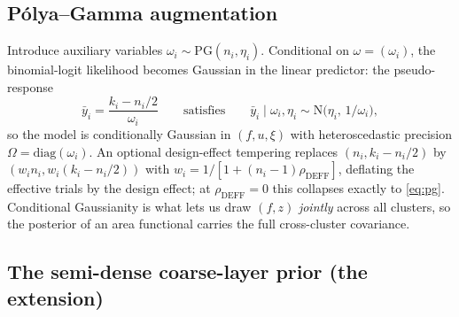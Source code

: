 \documentclass[11pt]{article}
\theoremstyle{remark}
\newcommand{\N}{\mathrm{N}}
\newcommand{\PG}{\mathrm{PG}}
\begin{document}
\subsection{P\'olya--Gamma augmentation}\label{sec:pg}

Introduce auxiliary variables $\omega_i \sim \PG(n_i,\eta_i)$. Conditional on
$\omega=(\omega_i)$, the binomial-logit likelihood becomes Gaussian in the linear
predictor: the pseudo-response
\begin{equation}\label{eq:pg}
\bar y_i = \frac{k_i - n_i/2}{\omega_i}
\qquad\text{satisfies}\qquad
\bar y_i \mid \omega_i,\eta_i \sim \N\!\bigl(\eta_i,\, 1/\omega_i\bigr),
\end{equation}
so the model is conditionally Gaussian in $(f,u,\xi)$ with heteroscedastic
precision $\Omega=\mathrm{diag}(\omega_i)$. An optional design-effect tempering
replaces $(n_i, k_i-n_i/2)$ by $(w_i n_i, w_i(k_i-n_i/2))$ with $w_i =
1/[1+(n_i-1)\rho_{\mathrm{DEFF}}]$, deflating the effective trials by the design
effect; at $\rho_{\mathrm{DEFF}}=0$ this collapses exactly to
\eqref{eq:pg}. Conditional Gaussianity is what lets us draw $(f,z)$
\emph{jointly} across all clusters, so the posterior of an area functional carries
the full cross-cluster covariance.

\subsection{The semi-dense coarse-layer prior (the extension)}\label{sec:floor}
\end{document}
